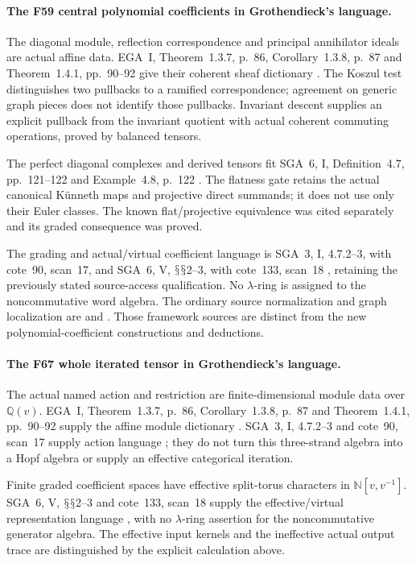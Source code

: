 \documentclass[11pt,a4paper]{article}
\newcommand{\Q}{\mathbb Q}\newcommand{\Z}{\mathbb Z}\newcommand{\C}{\mathbb C}\newcommand{\N}{\mathbb N}\newcommand{\F}{\mathbb F}
\renewcommand{\S}{\ensuremath{\mathsection}}
\newcommand{\fid}[1]{\textsf{#1}}\newcommand{\gate}[1]{\textsf{#1}}
\theoremstyle{named}\newtheorem{finding}{Finding}[section]
\theoremstyle{definition}\newtheorem{definition}[finding]{Definition}
\theoremstyle{remark}\newtheorem{remark}[finding]{Remark}
\begin{document}
\paragraph{The F59 central polynomial coefficients in Grothendieck's language.}
The diagonal module, reflection correspondence and
principal annihilator ideals are actual affine data.
EGA~I, Theorem~1.3.7, p.~86, Corollary~1.3.8,
p.~87 and Theorem~1.4.1, pp.~90--92 give their
coherent sheaf dictionary \cite{EGA}.
The Koszul test distinguishes two pullbacks to a
ramified correspondence; agreement on generic
graph pieces does not identify those pullbacks.
Invariant descent supplies an explicit pullback
from the invariant quotient with actual coherent
commuting operations, proved by balanced tensors.

The perfect diagonal complexes and derived tensors
fit SGA~6, I, Definition~4.7, pp.~121--122 and
Example~4.8, p.~122 \cite{SGA6}.
The flatness gate retains the actual canonical
K\"unneth maps and projective direct summands;
it does not use only their Euler classes.
The known flat/projective equivalence was cited
separately and its graded consequence was proved.

The grading and actual/virtual coefficient language
is SGA~3, I, 4.7.2--3, with cote~90, scan~17,
and SGA~6, V, \S\S2--3, with cote~133, scan~18
\cite{SGA3,SGA6,Archive}, retaining the previously
stated source-access qualification.
No \(\lambda\)-ring is assigned to the noncommutative
word algebra. The ordinary source normalization
and graph localization are
\cite[\S\S3.3--3.5]{EW} and
\cite[\S\S1.1--1.2, Theorem~1.6 and Remark~1.7]{EWLocalized}.
Those framework sources are distinct from the new
polynomial-coefficient constructions and deductions.

\paragraph{The \fid{F67} whole iterated tensor in Grothendieck's language.}
The actual named action and restriction are
finite-dimensional module data over \(\Q(v)\).
EGA~I, Theorem~1.3.7, p.~86,
Corollary~1.3.8, p.~87 and
Theorem~1.4.1, pp.~90--92 supply the affine
module dictionary \cite{EGA}.
SGA~3, I, 4.7.2--3 and cote~90, scan~17
supply action language \cite{SGA3,Archive};
they do not turn this three-strand algebra
into a Hopf algebra or supply an effective
categorical iteration.

Finite graded coefficient spaces have effective
split-torus characters in \(\N[v,v^{-1}]\).
SGA~6, V, \S\S2--3 and cote~133, scan~18
supply the effective/virtual representation
language \cite{SGA6,Archive}, with no
\(\lambda\)-ring assertion for the
noncommutative generator algebra.
The effective input kernels and the ineffective
actual output trace are distinguished by the
explicit calculation above.
\end{document}
